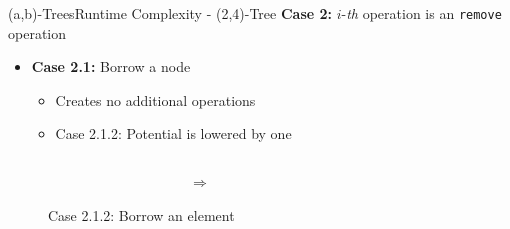 \begin{frame}{(a,b)-Trees}{Runtime Complexity - (2,4)-Tree}
  \textbf{Case 2:}
  {\color{MainA}$i$}-\textit{th} operation is an
  \texttt{\color{MainA}remove} operation
  \begin{itemize}
    \item<2->
    \textbf{Case 2.1:} Borrow a node
    \begin{itemize}
      \item<3->
      Creates no additional operations
      \item<4->
      Case 2.1.2: Potential is lowered by one
    \end{itemize}
  \end{itemize}
  \begin{figure}
    \begin{columns}
      \begin{column}{0.35\linewidth}
        \begin{adjustbox}{width=\linewidth}
          
        \end{adjustbox}
      \end{column}
      \begin{column}{0.1\linewidth}
        \begin{center}
          $\Rightarrow$
        \end{center}
      \end{column}
      \begin{column}{0.35\linewidth}
        \begin{adjustbox}{width=\linewidth}
          
        \end{adjustbox}
      \end{column}
    \end{columns}
    \caption{Case 2.1.2: Borrow an element}
    \label{fig:a_b_tree:move_potential_2}
  \end{figure}
\end{frame}


